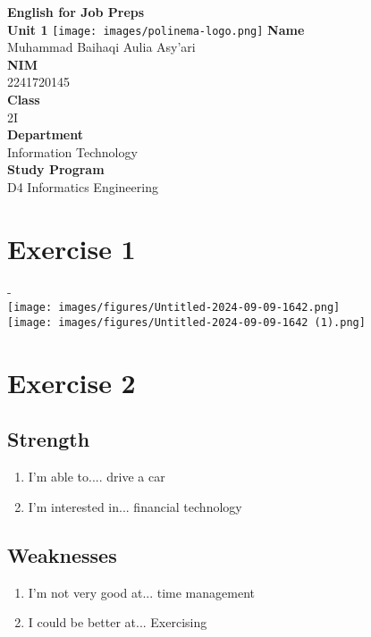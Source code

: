 \documentclass[12pt,titlepage]{article}
\newcommand{\vSubject}{English for Job Preps}
\newcommand{\vSubtitle}{Unit 1}
\newcommand{\vName}{Muhammad Baihaqi Aulia Asy'ari}
\newcommand{\vNIM}{2241720145}
\newcommand{\vClass}{2I}
\newcommand{\vDepartment}{Information Technology}
\newcommand{\vStudyProgram}{D4 Informatics Engineering}
\begin{document}
\begin{titlepage}
    \centering
    \vfill
    {\bfseries\LARGE
        \vSubject\\
        \vskip0.25cm
        \vSubtitle
    }
    \vfill
    \texttt{[image: images/polinema-logo.png]}
    \vfill
    {
        \textbf{Name}\\
        \vName\\
        \vskip0.5cm
        \textbf{NIM}\\
        \vNIM\\
        \vskip0.5cm
        \textbf{Class}\\
        \vClass\\
        \vskip0.5cm
        \textbf{Department}\\
        \vDepartment\\
        \vskip0.5cm
        \textbf{Study Program}\\
        \vStudyProgram
    }
\end{titlepage}

\newpage

\section*{Exercise 1}
- \\
\texttt{[image: images/figures/Untitled-2024-09-09-1642.png]} \\
\texttt{[image: images/figures/Untitled-2024-09-09-1642 (1).png]}

\section*{Exercise 2}
\subsection*{Strength}
\begin{enumerate}
    \item I’m able to.... drive a car
    \item I’m interested in... financial technology
\end{enumerate}
\subsection*{Weaknesses}
\begin{enumerate}
    \item I’m not very good at... time management
    \item I could be better at... Exercising
\end{enumerate}
\end{document}
